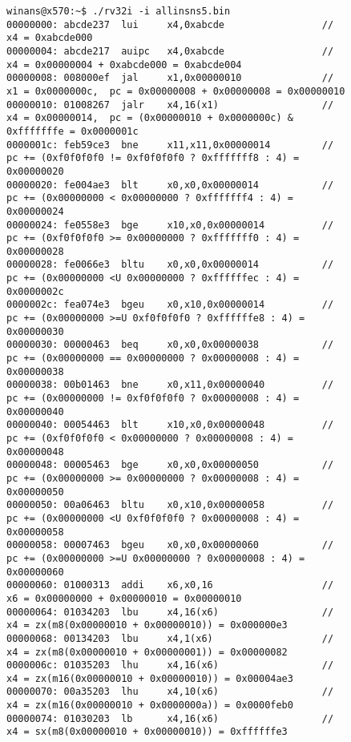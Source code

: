 \documentclass{article}
\begin{document}
\begin{figure}[ht]
\hspace*{-1.5cm}\begin{minipage}{\textwidth}
\centering
{\footnotesize
\begin{verbatim}
winans@x570:~$ ./rv32i -i allinsns5.bin
00000000: abcde237  lui     x4,0xabcde                 // x4 = 0xabcde000
00000004: abcde217  auipc   x4,0xabcde                 // x4 = 0x00000004 + 0xabcde000 = 0xabcde004
00000008: 008000ef  jal     x1,0x00000010              // x1 = 0x0000000c,  pc = 0x00000008 + 0x00000008 = 0x00000010
00000010: 01008267  jalr    x4,16(x1)                  // x4 = 0x00000014,  pc = (0x00000010 + 0x0000000c) & 0xfffffffe = 0x0000001c
0000001c: feb59ce3  bne     x11,x11,0x00000014         // pc += (0xf0f0f0f0 != 0xf0f0f0f0 ? 0xfffffff8 : 4) = 0x00000020
00000020: fe004ae3  blt     x0,x0,0x00000014           // pc += (0x00000000 < 0x00000000 ? 0xfffffff4 : 4) = 0x00000024
00000024: fe0558e3  bge     x10,x0,0x00000014          // pc += (0xf0f0f0f0 >= 0x00000000 ? 0xfffffff0 : 4) = 0x00000028
00000028: fe0066e3  bltu    x0,x0,0x00000014           // pc += (0x00000000 <U 0x00000000 ? 0xffffffec : 4) = 0x0000002c
0000002c: fea074e3  bgeu    x0,x10,0x00000014          // pc += (0x00000000 >=U 0xf0f0f0f0 ? 0xffffffe8 : 4) = 0x00000030
00000030: 00000463  beq     x0,x0,0x00000038           // pc += (0x00000000 == 0x00000000 ? 0x00000008 : 4) = 0x00000038
00000038: 00b01463  bne     x0,x11,0x00000040          // pc += (0x00000000 != 0xf0f0f0f0 ? 0x00000008 : 4) = 0x00000040
00000040: 00054463  blt     x10,x0,0x00000048          // pc += (0xf0f0f0f0 < 0x00000000 ? 0x00000008 : 4) = 0x00000048
00000048: 00005463  bge     x0,x0,0x00000050           // pc += (0x00000000 >= 0x00000000 ? 0x00000008 : 4) = 0x00000050
00000050: 00a06463  bltu    x0,x10,0x00000058          // pc += (0x00000000 <U 0xf0f0f0f0 ? 0x00000008 : 4) = 0x00000058
00000058: 00007463  bgeu    x0,x0,0x00000060           // pc += (0x00000000 >=U 0x00000000 ? 0x00000008 : 4) = 0x00000060
00000060: 01000313  addi    x6,x0,16                   // x6 = 0x00000000 + 0x00000010 = 0x00000010
00000064: 01034203  lbu     x4,16(x6)                  // x4 = zx(m8(0x00000010 + 0x00000010)) = 0x000000e3
00000068: 00134203  lbu     x4,1(x6)                   // x4 = zx(m8(0x00000010 + 0x00000001)) = 0x00000082
0000006c: 01035203  lhu     x4,16(x6)                  // x4 = zx(m16(0x00000010 + 0x00000010)) = 0x00004ae3
00000070: 00a35203  lhu     x4,10(x6)                  // x4 = zx(m16(0x00000010 + 0x0000000a)) = 0x0000feb0
00000074: 01030203  lb      x4,16(x6)                  // x4 = sx(m8(0x00000010 + 0x00000010)) = 0xffffffe3

\end{verbatim}}
\end{minipage}
\end{figure}
\end{document}
